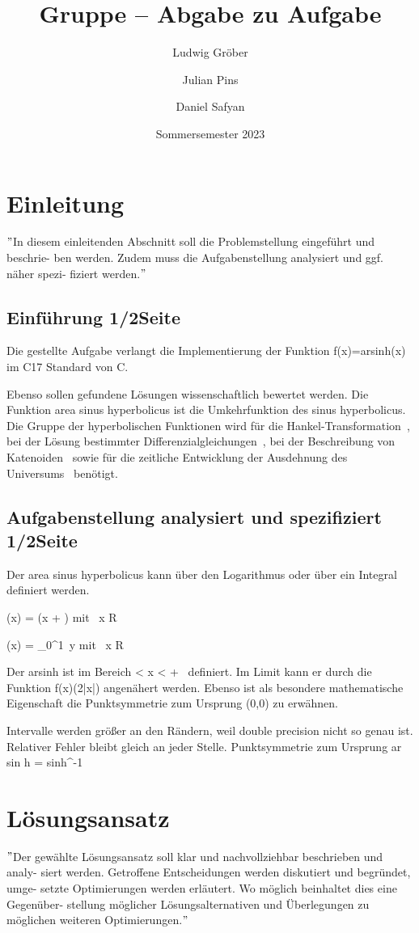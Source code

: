 \documentclass[course=erap]{aspdoc}
\author{Ludwig Gröber \and Julian Pins \and Daniel Safyan}
\date{Sommersemester 2023} %
\title{Gruppe \theGroup{} -- Abgabe zu Aufgabe \theNumber}
\begin{document}
\maketitle

\section{Einleitung}
\("\)In diesem einleitenden Abschnitt soll die Problemstellung eingeführt und beschrie- ben werden.
Zudem muss die Aufgabenstellung analysiert und ggf. näher spezi- fiziert werden.\("\)\n
\subsection{Einführung 1/2Seite}
Die gestellte Aufgabe verlangt die Implementierung der Funktion f(x)=arsinh(x) im C17 Standard von C.


Ebenso sollen gefundene Lösungen wissenschaftlich bewertet werden.
Die Funktion area sinus hyperbolicus ist die Umkehrfunktion des sinus hyperbolicus.
Die Gruppe der hyperbolischen Funktionen wird für die Hankel-Transformation~\cite{hankel},
bei der Lösung bestimmter Differenzialgleichungen~\cite{differenzial}, bei der Beschreibung von Katenoiden~\cite{katenoid}
sowie für die zeitliche Entwicklung der Ausdehnung des Universums~\cite{katenoid} benötigt.


\subsection{Aufgabenstellung analysiert und spezifiziert 1/2Seite}
Der area sinus hyperbolicus kann über den Logarithmus oder über ein Integral definiert werden.

(x) = \ln \left(x +  \right) mit \, x \in R


(x) = \int\_{0}^{1}  \,y mit \, x \in R



Der arsinh ist im Bereich \infty < x < + \infty \, definiert.
Im Limit kann er durch die Funktion f(x)\to \pm \ln(2|x|) angenähert werden.
Ebenso ist als besondere mathematische Eigenschaft die Punktsymmetrie zum Ursprung (0,0) zu erwähnen.

Intervalle werden größer an den Rändern, weil double precision nicht so genau ist.
Relativer Fehler bleibt gleich an jeder Stelle.
Punktsymmetrie zum Ursprung
ar sin h = sinh^-1


\section{Lösungsansatz}
\("\)Der gewählte Lösungsansatz soll klar und nachvollziehbar beschrieben und analy- siert werden.
Getroffene Entscheidungen werden diskutiert und begründet, umge- setzte Optimierungen werden erläutert.
Wo möglich beinhaltet dies eine Gegenüber- stellung möglicher Lösungsalternativen und Überlegungen zu möglichen weiteren Optimierungen.\("\)
\end{document}
